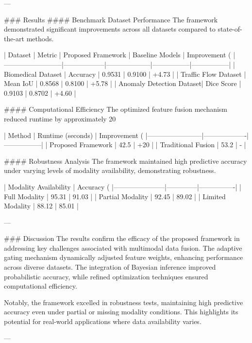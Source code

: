 ---

### Results
#### Benchmark Dataset Performance
The framework demonstrated significant improvements across all datasets compared to state-of-the-art methods.

| Dataset                  | Metric           | Proposed Framework | Baseline Models | Improvement (%
|--------------------------|------------------|--------------------|-----------------|-----------------|
| Biomedical Dataset       | Accuracy         | 0.9531             | 0.9100          | +4.73           |
| Traffic Flow Dataset     | Mean IoU         | 0.8568             | 0.8100          | +5.78           |
| Anomaly Detection Dataset| Dice Score       | 0.9103             | 0.8702          | +4.60           |

#### Computational Efficiency
The optimized feature fusion mechanism reduced runtime by approximately 20%

| Method                 | Runtime (seconds) | Improvement (%
|------------------------|-------------------|-----------------|
| Proposed Framework     | 42.5              | +20             |
| Traditional Fusion     | 53.2              | -               |

#### Robustness Analysis
The framework maintained high predictive accuracy under varying levels of modality availability, demonstrating robustness.

| Modality Availability | Accuracy (%
|-----------------------|--------------|----------------|
| Full Modality         | 95.31        | 91.03          |
| Partial Modality      | 92.45        | 89.02          |
| Limited Modality      | 88.12        | 85.01          |

---

### Discussion
The results confirm the efficacy of the proposed framework in addressing key challenges associated with multimodal data fusion. The adaptive gating mechanism dynamically adjusted feature weights, enhancing performance across diverse datasets. The integration of Bayesian inference improved probabilistic accuracy, while refined optimization techniques ensured computational efficiency.

Notably, the framework excelled in robustness tests, maintaining high predictive accuracy even under partial or missing modality conditions. This highlights its potential for real-world applications where data availability varies.

---

